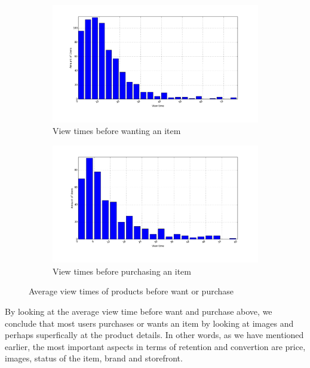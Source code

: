 \begin{figure}[H]
  \centering
  \begin{subfigure}{.5\textwidth}
      \centering
      \includegraphics[width=\dualGraphWidth]{image/product_wanteddistribution.png}
      \caption{View times before wanting an item}
      \label{figure:viewWant}
  \end{subfigure}%
  \begin{subfigure}{.5\textwidth}
      \centering
      \includegraphics[width=\dualGraphWidth]{image/product_purchase_intendeddistribution.png}
      \caption{View times before purchasing an item}
      \label{figure:viewBuy}
  \end{subfigure}
  \label{fig:view-times}
  \caption{Average view times of products before want or purchase}
\end{figure}

By looking at the average view time before want and purchase above, we conclude
that most users purchases or wants an item by looking at images and perhaps
superfically at the product details. In other words, as we have mentioned
earlier, the most important aspects in terms of retention and convertion are
price, images, status of the item, brand and storefront.

